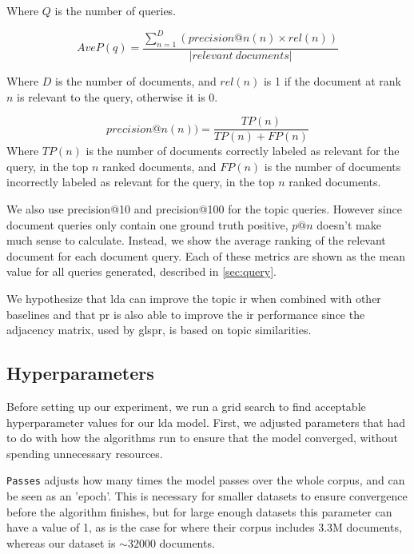 \noindent Where $Q$ is the number of queries.

\begin{equation}
	AveP(q) = \frac{\sum_{n = 1}^{D} (precision@n(n) \times rel(n))}{|relevant~documents|}
\end{equation}

\noindent Where $D$ is the number of documents, and $rel(n)$ is 1 if the document at rank $n$ is relevant to the query, otherwise it is 0.

\begin{equation}
	precision@n(n)) = \frac{TP(n)}{TP(n) + FP(n)}
\end{equation}
\noindent Where $TP(n)$ is the number of documents correctly labeled as relevant for the query, in the top $n$ ranked documents, and $FP(n)$ is the number of documents incorrectly labeled as relevant for the query, in the top $n$ ranked documents.

We also use precision@10 and precision@100 for the topic queries.
However since document queries only contain one ground truth positive, $p@n$ doesn't make much sense to calculate. 
Instead, we show the average ranking of the relevant document for each document query.
Each of these metrics are shown as the mean value for all queries generated, described in \autoref{sec:query}.

We hypothesize that \gls{lda} can improve the topic \gls{ir} when combined with other baselines and that \gls{pr} is also able to improve the \gls{ir} performance since the adjacency matrix, used by gls{pr}, is based on topic similarities.


\subsection{Hyperparameters}\label{subsec:hyperparameters}
Before setting up our experiment, we run a grid search to find acceptable hyperparameter values for our \gls{lda} model.
First, we adjusted parameters that had to do with how the algorithms run to ensure that the model converged, without spending unnecessary resources.

\texttt{Passes} adjusts how many times the model passes over the whole corpus, and can be seen as an 'epoch'. 
This is necessary for smaller datasets to ensure convergence before the algorithm finishes, but for large enough datasets this parameter can have a value of 1, as is the case for \citeauthor{blei2010online}\cite{blei2010online} where their corpus includes 3.3M documents, whereas our dataset is $\sim32000$ documents.

